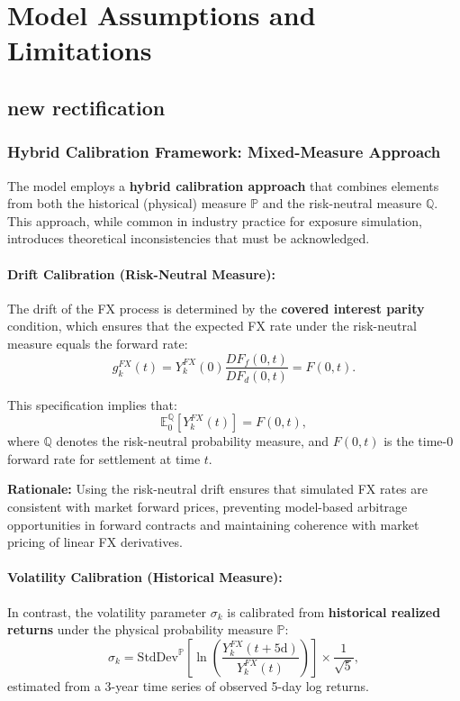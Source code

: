 \section{Model Assumptions and Limitations}

\subsection{new rectification}
\subsubsection{Hybrid Calibration Framework: Mixed-Measure Approach}

The model employs a \textbf{hybrid calibration approach} that combines elements from both the historical (physical) measure $\mathbb{P}$ and the risk-neutral measure $\mathbb{Q}$. This approach, while common in industry practice for exposure simulation, introduces theoretical inconsistencies that must be acknowledged.

\paragraph{Drift Calibration (Risk-Neutral Measure):}
The drift of the FX process is determined by the \textbf{covered interest parity} condition, which ensures that the expected FX rate under the risk-neutral measure equals the forward rate:
\begin{equation}
	g_k^{FX}(t) = Y_k^{FX}(0)\frac{DF_f(0,t)}{DF_d(0,t)} = F(0,t).
\end{equation}

This specification implies that:
\begin{equation}
	\mathbb{E}^{\mathbb{Q}}_0\left[Y_k^{FX}(t)\right] = F(0,t),
\end{equation}
where $\mathbb{Q}$ denotes the risk-neutral probability measure, and $F(0,t)$ is the time-0 forward rate for settlement at time $t$.

\textbf{Rationale:} Using the risk-neutral drift ensures that simulated FX rates are consistent with market forward prices, preventing model-based arbitrage opportunities in forward contracts and maintaining coherence with market pricing of linear FX derivatives.

\paragraph{Volatility Calibration (Historical Measure):}
In contrast, the volatility parameter $\sigma_k$ is calibrated from \textbf{historical realized returns} under the physical probability measure $\mathbb{P}$:
\begin{equation}
	\sigma_k = \text{StdDev}^{\mathbb{P}}\left[\ln\!\left(\frac{Y_k^{FX}(t+5\text{d})}{Y_k^{FX}(t)}\right)\right] \times \frac{1}{\sqrt{5}},
\end{equation}
estimated from a 3-year time series of observed 5-day log returns.

